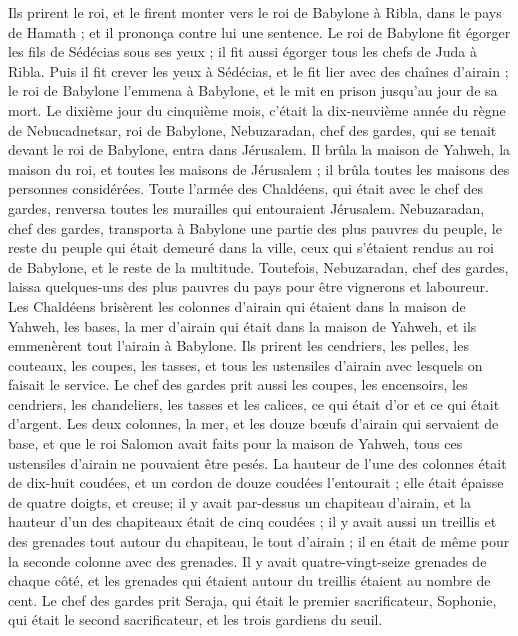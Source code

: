 \begin{multicols}{2}
Ils prirent le roi, et le firent monter vers le roi de Babylone à Ribla, dans le pays de Hamath ; et il prononça contre lui une sentence.
Le roi de Babylone fit égorger les fils de Sédécias sous ses yeux ; il fit aussi égorger tous les chefs de Juda à Ribla.
Puis il fit crever les yeux à Sédécias, et le fit lier avec des chaînes d'airain ; le roi de Babylone l'emmena à Babylone, et le mit en prison jusqu'au jour de sa mort.
Le dixième jour du cinquième mois, c'était la dix-neuvième année du règne de Nebucadnetsar, roi de Babylone, Nebuzaradan, chef des gardes, qui se tenait devant le roi de Babylone, entra dans Jérusalem.
Il brûla la maison de Yahweh, la maison du roi, et toutes les maisons de Jérusalem ; il brûla toutes les maisons des personnes considérées.
Toute l'armée des Chaldéens, qui était avec le chef des gardes, renversa toutes les murailles qui entouraient Jérusalem.
Nebuzaradan, chef des gardes, transporta à Babylone une partie des plus pauvres du peuple, le reste du peuple qui était demeuré dans la ville, ceux qui s'étaient rendus au roi de Babylone, et le reste de la multitude.
Toutefois, Nebuzaradan, chef des gardes, laissa quelques-uns des plus pauvres du pays pour être vignerons et laboureur.
Les Chaldéens brisèrent les colonnes d'airain qui étaient dans la maison de Yahweh, les bases, la mer d'airain qui était dans la maison de Yahweh, et ils emmenèrent tout l'airain à Babylone.
Ils prirent les cendriers, les pelles, les couteaux, les coupes, les tasses, et tous les ustensiles d'airain avec lesquels on faisait le service.
Le chef des gardes prit aussi les coupes, les encensoirs, les cendriers, les chandeliers, les tasses et les calices, ce qui était d'or et ce qui était d'argent.
Les deux colonnes, la mer, et les douze bœufs d'airain qui servaient de base, et que le roi Salomon avait faits pour la maison de Yahweh, tous ces ustensiles d'airain ne pouvaient être pesés.
La hauteur de l'une des colonnes était de dix-huit coudées, et un cordon de douze coudées l'entourait ; elle était épaisse de quatre doigts, et creuse;
il y avait par-dessus un chapiteau d'airain, et la hauteur d'un des chapiteaux était de cinq coudées ; il y avait aussi un treillis et des grenades tout autour du chapiteau, le tout d'airain ; il en était de même pour la seconde colonne avec des grenades.
Il y avait quatre-vingt-seize grenades de chaque côté, et les grenades qui étaient autour du treillis étaient au nombre de cent.
Le chef des gardes prit Seraja, qui était le premier sacrificateur, Sophonie, qui était le second sacrificateur, et les trois gardiens du seuil.

\end{multicols}
